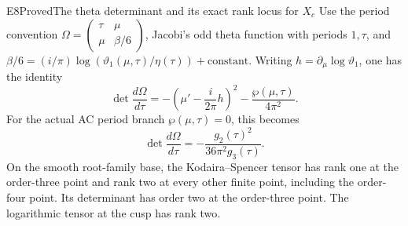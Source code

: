 \begin{statement}{E8}{Proved}{The theta determinant and its exact rank locus for $X_c$}
Use the period convention
$\Omega=\left(\begin{smallmatrix}\tau&\mu\\\mu&\beta/6\end{smallmatrix}\right)$,
Jacobi's odd theta function with periods $1,\tau$, and
$\beta/6=(i/\pi)\log(\vartheta_1(\mu,\tau)/\eta(\tau))+\text{constant}$.
Writing $h=\partial_\mu\log\vartheta_1$, one has the identity
\begin{equation}\label{eq:E-theta-general}
 \det\frac{d\Omega}{d\tau}
 =-\left(\mu'-\frac{i}{2\pi}h\right)^2
       -\frac{\wp(\mu,\tau)}{4\pi^2}.
\end{equation}
For the actual AC period branch $\wp(\mu,\tau)=0$, this becomes
\[
 \det\frac{d\Omega}{d\tau}
       =-\frac{g_2(\tau)^2}{36\pi^2g_3(\tau)}.
\]
On the smooth root-family base, the Kodaira--Spencer tensor has rank
one at the order-three point and rank two at every other finite
point, including the order-four point. Its determinant has order
two at the order-three point. The logarithmic tensor at the cusp
has rank two.
\end{statement}
